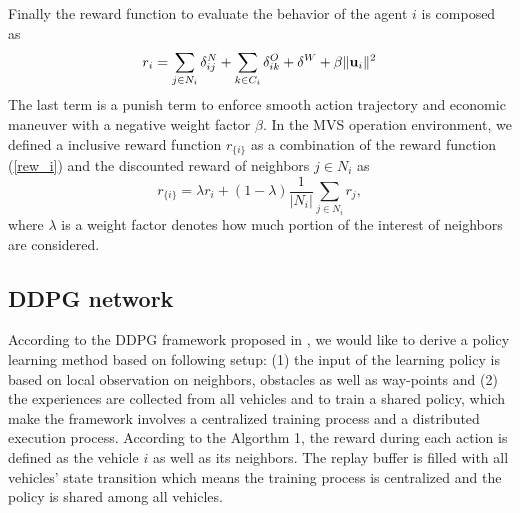 \documentclass[letterpaper,10 pt,conference]{ieeeconf}
\begin{document}
Finally the reward function to evaluate the behavior of the agent $i$ is composed as 
\begin{equation}
r_i = \sum\limits_{j\in N_i}\delta_{ij}^N + \sum\limits_{k\in C_i}\delta_{ik}^O + \delta^W +\beta\|\mathbf{u}_i\|^2
\label{rew_i}
\end{equation}
The last term is a punish term to enforce smooth action trajectory and economic maneuver with a negative weight factor $\beta$.
In the MVS operation environment, we defined a inclusive reward function $r_{\{i\}}$ as a combination of the reward function (\ref{rew_i}) and the discounted reward of neighbors $j\in N_i$ as 
\begin{equation}
r_{\{i\}} = \lambda r_i + (1-\lambda) \frac{1}{|N_i|}\sum_{j\in N_i}r_j,
\end{equation}
where $\lambda$ is a weight factor denotes how much portion of the interest of neighbors are considered.
\subsection{DDPG network}
According to the DDPG framework proposed in \cite{DBLP:journals/corr/LoweWTHAM17},  we would like to derive a policy learning method based on following setup: (1) the input of the learning policy is based on local observation on neighbors, obstacles as well as way-points and (2) the experiences are collected from all vehicles and to train a shared policy, which make the framework involves a centralized training process and a distributed execution process. According to the Algorthm 1, the reward during each action is defined as the vehicle $i$ as well as its neighbors. The replay buffer is filled with all vehicles' state transition which means the training process is centralized and the policy is shared among all vehicles.
\end{document}
